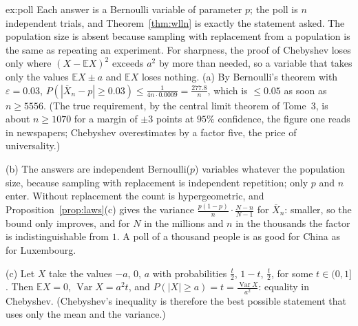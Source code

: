 \begin{solution}{ex:poll}
\idea Each answer is a Bernoulli variable of parameter $p$; the poll is $n$ independent trials, and Theorem~\ref{thm:wlln} is exactly the statement asked. The population size is absent because sampling with replacement from a population is the same as repeating an experiment. For sharpness, the proof of Chebyshev loses only where $(X-\mathbb EX)^2$ exceeds $a^2$ by more than needed, so a variable that takes only the values $\mathbb EX\pm a$ and $\mathbb EX$ loses nothing.
\writeup (a) By Bernoulli's theorem with $\varepsilon=0.03$, $P(|\overline X_n-p|\ge0.03)\le\frac1{4n\cdot0.0009}=\frac{277.8}n$, which is $\le0.05$ as soon as $n\ge5556$. (The true requirement, by the central limit theorem of Tome~3, is about $n\ge1070$ for a margin of $\pm3$ points at $95\%$ confidence, the figure one reads in newspapers; Chebyshev overestimates by a factor five, the price of universality.)

(b) The answers are independent Bernoulli($p$) variables whatever the population size, because sampling with replacement is independent repetition; only $p$ and $n$ enter. Without replacement the count is hypergeometric, and Proposition~\ref{prop:laws}(c) gives the variance $\frac{p(1-p)}n\cdot\frac{N-n}{N-1}$ for $\overline X_n$: smaller, so the bound only improves, and for $N$ in the millions and $n$ in the thousands the factor is indistinguishable from $1$. A poll of a thousand people is as good for China as for Luxembourg.

(c) Let $X$ take the values $-a$, $0$, $a$ with probabilities $\frac t2$, $1-t$, $\frac t2$, for some $t\in(0,1]$. Then $\mathbb EX=0$, $\operatorname{Var}X=a^2t$, and $P(|X|\ge a)=t=\frac{\operatorname{Var}X}{a^2}$: equality in Chebyshev. (Chebyshev's inequality is therefore the best possible statement that uses only the mean and the variance.)
\end{solution}


